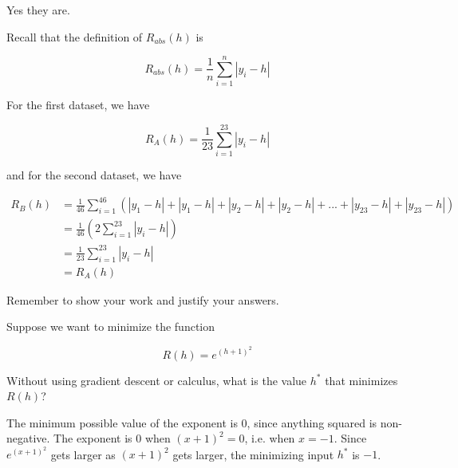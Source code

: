 \documentclass{article}
\begin{document}
\begin{probset}
\begin{prob}
\begin{subprobset}
\begin{subprob}[3 Points]
\begin{soln}

Yes they are.

Recall that the definition of $R_{abs}(h)$ is

$$R_{abs}(h) = \frac{1}{n} \sum_{i = 1}^n |y_i - h|$$

For the first dataset, we have

$$R_{A}(h) = \frac{1}{23} \sum_{i = 1}^{23} |y_i - h|$$

and for the second dataset, we have

\begin{align*}R_{B}(h) &= \frac{1}{46} \sum_{i = 1}^{46} \left( |y_1 - h| + |y_1 - h| + |y_2 - h| + |y_2 - h| + ... + |y_{23} - h| + |y_{23} - h| \right) \\
&= \frac{1}{46} \left( 2 \sum_{i = 1}^{23} |y_i - h| \right) \\ &= \frac{1}{23} \sum_{i = 1}^{23} |y_i - h| \\ &= R_{A}(h) \end{align*}


\end{soln}

\vspace{1in}

\end{subprob}

\end{subprobset}

\end{prob}

\newpage

\begin{prob}

Remember to show your work and justify your answers.

Suppose we want to minimize the function

$$R(h) = e^{(h + 1)^2}$$

\begin{subprobset}

\begin{subprob}[1.5 Points]
Without using gradient descent or calculus, what is the value $h^*$ that minimizes $R(h)$?

\begin{soln}

The minimum possible value of the exponent is $0$, since anything squared is non-negative. The exponent is 0 when $(x+1)^2 = 0$, i.e. when $x = -1$. Since $e^{(x+1)^2}$ gets larger as $(x+1)^2$ gets larger, the minimizing input $h^*$ is $-1$.


\end{soln}
\end{subprob}
\end{subprobset}
\end{prob}
\end{probset}
\end{document}
